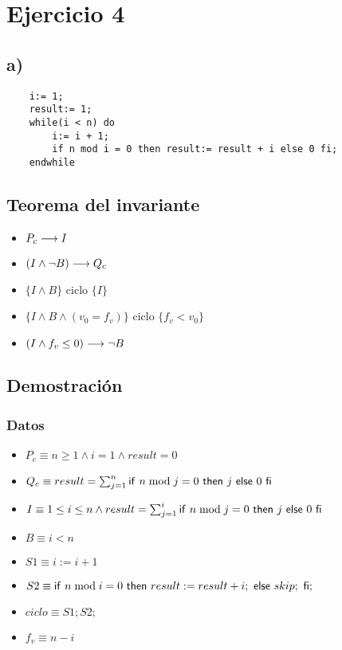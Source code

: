 \documentclass{article}
\begin{document}
\section*{Ejercicio 4}

\subsection*{a)}

\begin{verbatim}
    i:= 1;
    result:= 1;
    while(i < n) do
        i:= i + 1;
        if n mod i = 0 then result:= result + i else 0 fi;
    endwhile
\end{verbatim}

\subsection*{Teorema del invariante}
\begin{itemize}
    \item $P_{c} \longrightarrow I$
    \item $(I \wedge \neg B) \longrightarrow Q_{c}$
    \item $\{I \wedge B\}$ ciclo $\{ I \}$
    \item $\{I \wedge B \wedge (v_{0} = f_{v})\}$ ciclo $\{f_{v} < v_{0}\}$
    \item $(I \wedge f_{v} \leq 0) \longrightarrow \neg B$
\end{itemize}


\subsection*{Demostración}
\subsubsection*{Datos}
\begin{itemize}
    \item $P_{c}    \equiv n \geq 1 \wedge i = 1 \wedge result = 0$
    \item $Q_{c}    \equiv result = \sum_{j=1}^{n} \mathsf{if}\ n \bmod j = 0\ \mathsf{then}\ j\ \mathsf{else}\ 0\ \mathsf{fi}$
    \item $I        \equiv 1 \leq i \leq n \wedge result = \sum_{j=1}^{i} \mathsf{if}\ n \bmod j = 0\ \mathsf{then}\ j\ \mathsf{else}\ 0\ \mathsf{fi}$
    \item $B        \equiv i < n$
    \item $S1       \equiv i := i + 1$
    \item $S2       \equiv \mathsf{if}\ n \bmod i = 0\ \mathsf{then}\ result:= result + i;\ \mathsf{else}\ skip;\ \mathsf{fi};$
    \item $ciclo    \equiv S1;S2;$
    \item $f_{v}    \equiv n-i$
\end{itemize}
\end{document}
